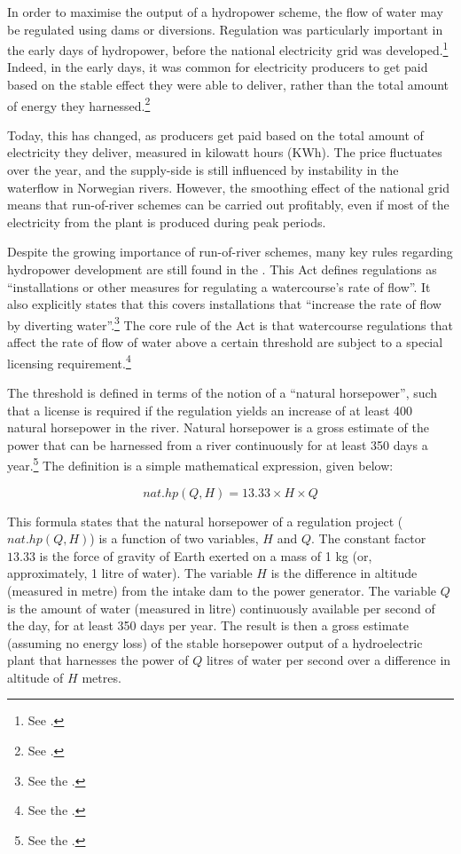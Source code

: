 In order to maximise the output of a hydropower scheme, the flow of water may be regulated using dams or diversions. Regulation was particularly important in the early days of hydropower, before the national electricity grid was developed.\footnote{See \cite[83]{uleberg08}.} Indeed, in the early days, it was common for electricity producers to get paid based on the stable effect they were able to deliver, rather than the total amount of energy they harnessed.\footnote{See \cite{sofienlund07}.}

Today, this has changed, as producers get paid based on the total amount of electricity they deliver,  measured in kilowatt hours (KWh). The price fluctuates over the year, and the supply-side is still influenced by instability in the waterflow in Norwegian rivers. However, the smoothing effect of the national grid means that run-of-river schemes can be carried out profitably, even if most of the electricity from the plant is produced during peak periods.

Despite the growing importance of run-of-river schemes, many key rules regarding hydropower development are still found in the \cite{wra17}. This Act defines regulations as ``installations or other measures for regulating a watercourse's rate of flow''. It also explicitly states that this covers installations that ``increase the rate of flow by diverting water''.\footnote{See the \dni\cite[1]{wra17}.} The core rule of the Act is that watercourse regulations that affect the rate of flow of water above a certain threshold are subject to a special licensing requirement.\footnote{See the \dni\cite[2]{wra17}.}

The threshold is defined in terms of the notion of a ``natural horsepower'', such that a license is required if the regulation yields an increase of at least 400 natural horsepower in the river. Natural horsepower is a gross estimate of the power that can be harnessed from a river continuously for at least 350 days a year.\footnote{See the \dni\cite[2]{wra17}.} The definition is a simple mathematical expression, given below:

$$
nat.hp(Q,H) = 13.33 \times H \times Q
$$

This formula states that the natural horsepower of a regulation project ($nat.hp(Q,H)$) is a function of two variables, $H$ and $Q$. The constant factor $13.33$ is the force of gravity of Earth exerted on a mass of 1 kg (or, approximately, 1 litre of water). The variable $H$ is the difference in altitude (measured in metre) from the intake dam to the power generator. The variable $Q$ is the amount of water (measured in litre) continuously available per second of the day, for at least 350 days per year. The result is then a gross estimate (assuming no energy loss) of the stable horsepower output of a hydroelectric plant that harnesses the power of $Q$ litres of water per second over a difference in altitude of $H$ metres.

